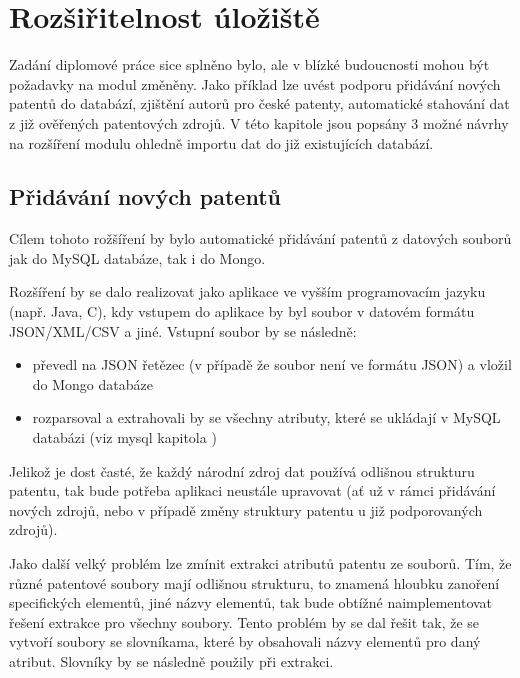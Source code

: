 \chapter{Rozšiřitelnost úložiště}
Zadání diplomové práce sice splněno bylo, ale v blízké budoucnosti mohou být požadavky na modul změněny. Jako příklad lze uvést podporu přidávání nových patentů do databází, zjištění autorů pro české patenty, automatické stahování dat z již ověřených patentových zdrojů. V této kapitole jsou popsány 3 možné návrhy na rozšíření modulu ohledně importu dat do již existujících databází.

\section{Přidávání nových patentů} \label{sec:new_patenty}
Cílem tohoto rožšíření by bylo automatické přidávání patentů z datových souborů jak do MySQL databáze, tak i do Mongo.

Rozšíření by se dalo realizovat jako aplikace ve vyšším programovacím jazyku (např. Java, C), kdy vstupem do aplikace by byl soubor v datovém formátu \gls{JSON}/\gls{XML}/\gls{CSV} a jiné. Vstupní soubor by se následně:
\begin{itemize}
\item převedl na \gls{JSON} řetězec (v případě že soubor není ve formátu \gls{JSON}) a vložil do Mongo databáze
\item rozparsoval a extrahovali by se všechny atributy, které se ukládají v MySQL databázi (viz mysql kapitola )
\end{itemize}

Jelikož je dost časté, že každý národní zdroj dat používá odlišnou strukturu patentu, tak bude potřeba aplikaci neustále upravovat (ať už v rámci přidávání nových zdrojů, nebo v případě změny struktury patentu u již podporovaných zdrojů).

Jako další velký problém lze zmínit extrakci atributů patentu ze souborů. Tím, že různé patentové soubory mají odlišnou strukturu, to znamená hloubku zanoření specifických elementů, jiné názvy elementů, tak bude obtížné naimplementovat řešení extrakce pro všechny soubory. Tento problém by se dal řešit tak, že se vytvoří soubory se slovníkama, které by obsahovali názvy elementů pro daný atribut. Slovníky by se následně použily při extrakci.

